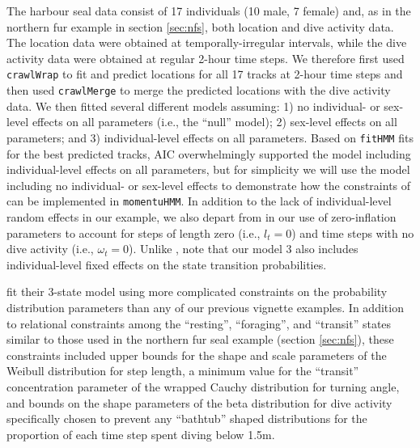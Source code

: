 \documentclass[12pt]{article}\usepackage[]{graphicx}\usepackage[]{xcolor}
\begin{document}
The harbour seal data consist of 17 individuals (10 male, 7 female) and, as in the northern fur example in section \ref{sec:nfs}, both location and dive activity data. The location data were obtained at temporally-irregular intervals, while the dive activity data were obtained at regular 2-hour time steps. We therefore first used \verb|crawlWrap| to fit and predict locations for all 17 tracks at 2-hour time steps and then used \verb|crawlMerge| to merge the predicted locations with the dive activity data. We then fitted several different models assuming: 1) no individual- or sex-level effects on all parameters (i.e., the ``null'' model); 2) sex-level effects on all parameters; and 3) individual-level effects on all parameters.  Based on \verb|fitHMM| fits for the best predicted tracks, AIC overwhelmingly supported the model including individual-level effects on all parameters, but for simplicity we will use the model including no individual- or sex-level effects to demonstrate how the constraints of \cite{McClintockEtAl2013c} can be implemented in \verb|momentuHMM|.  In addition to the lack of individual-level random effects in our example, we also depart from \cite{McClintockEtAl2013c} in our use of zero-inflation parameters to account for steps of length zero (i.e., $l_t=0$) and time steps with no dive activity (i.e., $\omega_t=0$). Unlike \cite{McClintockEtAl2013c}, note that our model 3 also includes individual-level fixed effects on the state transition probabilities.

\cite{McClintockEtAl2013c} fit their 3-state model using more complicated constraints on the probability distribution parameters than any of our previous vignette examples. In addition to relational constraints among the ``resting'', ``foraging'', and ``transit'' states similar to those used in the northern fur seal example (section \ref{sec:nfs}), these constraints included upper bounds for the shape and scale parameters of the Weibull distribution for step length, a minimum value for the ``transit'' concentration parameter of the wrapped Cauchy distribution for turning angle, and bounds on the shape parameters of the beta distribution for dive activity specifically chosen to prevent any ``bathtub'' shaped distributions for the proportion of each time step spent diving below 1.5m. 
\end{document}
